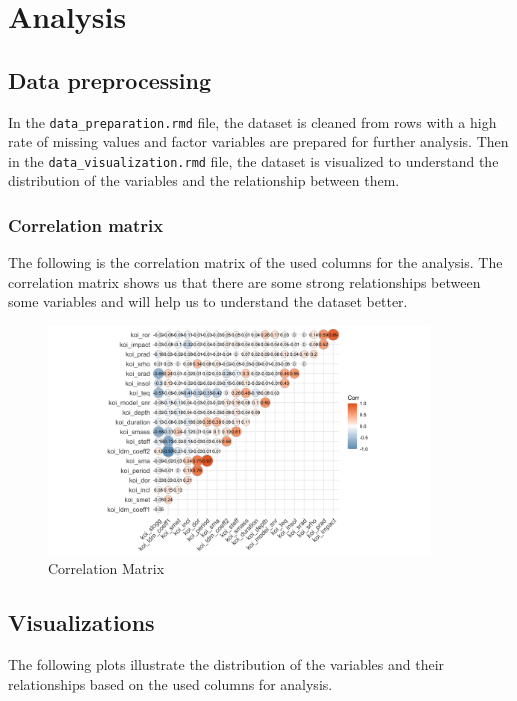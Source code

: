 \chapter{Analysis}
\section{Data preprocessing}
In the \texttt{data\_preparation.rmd} file, the dataset is cleaned from rows with a high rate of missing values and factor variables are prepared for further analysis. Then in the \texttt{data\_visualization.rmd} file, the dataset is visualized to understand the distribution of the variables and the relationship between them.
\subsection{Correlation matrix}
The following is the correlation matrix of the used columns for the analysis. The correlation matrix shows us that there are some strong relationships between some variables and will help us to understand the dataset better.
\begin{figure}[H]
    \centering
    \includegraphics[width=0.9\textwidth]{Immagini/cm.png}
    \caption{Correlation Matrix}
\end{figure}

\section{Visualizations}
The following plots illustrate the distribution of the variables and their relationships based on the used columns for analysis.

